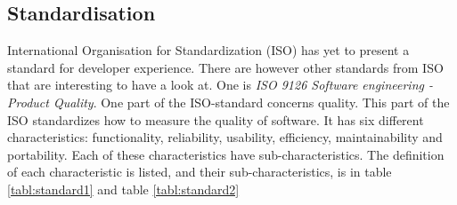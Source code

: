 \documentclass{article}
\begin{document}
\subsection{Standardisation}
International Organisation for Standardization (ISO) has yet to present a
standard for developer experience. There are however other standards from ISO
that are interesting to have a look at. One is \textit{ISO 9126 Software engineering - Product Quality}.
One part of the ISO-standard concerns quality. This part of the ISO standardizes how to measure the quality of software.
It has six different characteristics: functionality, reliability, usability, efficiency, maintainability and
portability. Each of these characteristics have sub-characteristics. The definition of each
characteristic is listed, and their sub-characteristics, is in table \ref{tabl:standard1} and table \ref{tabl:standard2}
\end{document}
